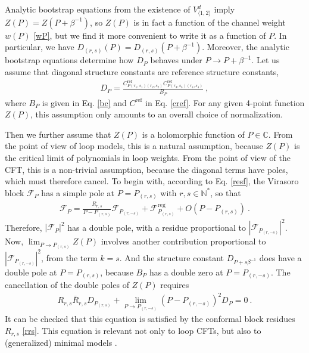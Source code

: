 \documentclass[12pt, a4paper]{article}
\theoremstyle{break}
\begin{document}
Analytic bootstrap equations from the existence of $V^d_{\langle 1,2\rangle}$ imply $Z(P)=Z(P+\beta^{-1})$, so $Z(P)$ is in fact a function of the channel weight $w(P)$ \eqref{wP}, but we find it more convenient to write it as a function of $P$. In particular, we have $D_{(r,s)}(P)=D_{(r,s)}(P+\beta^{-1})$. Moreover, the analytic bootstrap equations 
determine how $D_P$ behaves under $P\to P+\beta^{-1}$. Let us assume that diagonal structure constants are reference structure constants,
\begin{align}
 D_P = \frac{C^\text{ref}_{P(r_1,s_1)(r_2,s_2)}C^\text{ref}_{P(r_3,s_3)(r_4,s_4)}}{B_P}\ ,
\end{align}
where $B_P$ is given in Eq. \eqref{bc} and $C^\text{ref}$ in Eq. \eqref{cref}. For any given 4-point function $Z(P)$, this assumption only amounts to an overall choice of normalization. 

Then we further assume that $Z(P)$ is a holomorphic function of $P\in\mathbb{C}$. From the point of view of loop models, this is a natural assumption, because $Z(P)$ is the critical limit of polynomials in loop weights. From the point of view of the CFT, this is a non-trivial assumption, because the diagonal terms have poles, which must therefore cancel. 
To begin with, according to Eq. \eqref{resf}, the Virasoro block $\mathcal{F}_P$ has a simple pole at $P=P_{(r,s)}$ with $r,s\in \mathbb{N}^*$, so that 
\begin{align}
 \mathcal{F}_P = \frac{R_{r,s}}{P-P_{(r,s)}} \mathcal{F}_{P_{(r,-s)}} + \mathcal{F}^\text{reg}_{P_{(r,s)}} + O(P-P_{(r,s)}) \ . 
 \label{freg}
\end{align}
Therefore, $\left|\mathcal{F}_P\right|^2$ has a double pole, with a residue proportional to $\left|\mathcal{F}_{P_{(r,-s)}}\right|^2$. Now, $\lim_{P\to P_{(r,s)}} Z(P)$ involves another contribution proportional to $\left|\mathcal{F}_{P_{(r,-s)}}\right|^2$, from the term $k=s$. And the structure constant $D_{P+s\beta^{-1}}$ does have a double pole at $P=P_{(r,s)}$, because $B_P$ has a double zero at $P=P_{(r,-s)}$. The cancellation of the double poles of $Z(P)$ requires 
\begin{align}
 R_{r,s}\bar{R}_{r,s}D_{P_{(r,s)}} + \lim_{P\to P_{(r,-s)}}\left(P-P_{(r,-s)}\right)^2 D_P = 0 \ .
 \label{dpld}
\end{align}
It can be checked that this equation is satisfied by the conformal block residues $R_{r,s}$ \eqref{rrs}. This equation is relevant not only to loop CFTs, but also to (generalized) minimal models \cite{rib18}.
\end{document}
